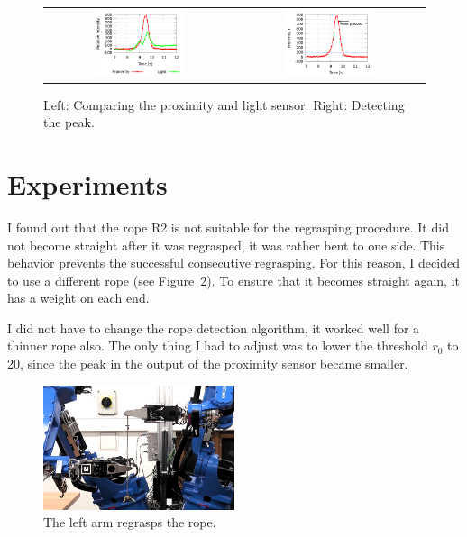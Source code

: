        \begin{figure}[h]
            \centering
            \begin{tabular}{cc}
            \includegraphics[width=0.49\textwidth]{ProximityVsLight.png}
            &
            \includegraphics[width=0.49\textwidth]{ProximityPeak.png}
            \end{tabular}
            \caption{Left: Comparing the proximity and light sensor. Right: Detecting the peak.}
            \label{fig:RopeDetection}
        \end{figure}


    \section{Experiments}
        I found out that the rope R2 is not suitable for the regrasping procedure. It did not become straight after it was regrasped, it was rather bent to one side. This behavior prevents the successful consecutive regrasping. For this reason, I decided to use a different rope (see Figure~\ref{fig:Regrasping}). To ensure that it becomes straight again, it has a weight on each end.

        I did not have to change the rope detection algorithm, it worked well for a thinner rope also. The only thing I had to adjust was to lower the threshold $r_0$ to 20, since the peak in the output of the proximity sensor became smaller.

        \begin{figure}
        \includegraphics[width=0.5\textwidth]{Regrasping.png}
        \centering
        \caption{The left arm regrasps the rope.}
        \label{fig:Regrasping}
        \end{figure}

